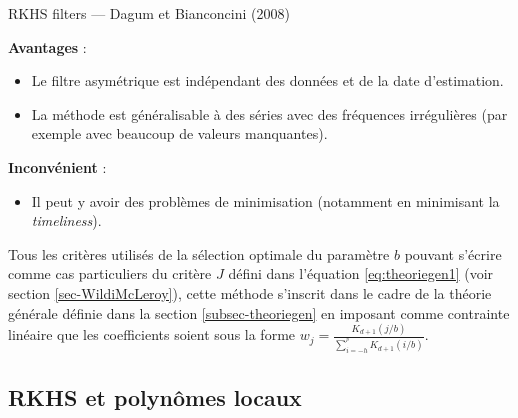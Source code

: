 \documentclass[
  11pt,
  french,
  a4paper]{article}
\providecommand{\tightlist}{%
  \setlength{\itemsep}{0pt}\setlength{\parskip}{0pt}}
\newcommand\1{\mathds{1}}
\begin{document}
\begin{summary_box}{RKHS filters --- Dagum et Bianconcini (2008)}

\textbf{Avantages} :

\begin{itemize}
\item
  Le filtre asymétrique est indépendant des données et de la date d'estimation.
\item
  La méthode est généralisable à des séries avec des fréquences irrégulières (par exemple avec beaucoup de valeurs manquantes).
\end{itemize}

\textbf{Inconvénient} :

\begin{itemize}
\tightlist
\item
  Il peut y avoir des problèmes de minimisation (notamment en minimisant la \emph{timeliness}).
\end{itemize}

\end{summary_box}

Tous les critères utilisés de la sélection optimale du paramètre \(b\) pouvant s'écrire comme cas particuliers du critère \(J\) défini dans l'équation \eqref{eq:theoriegen1} (voir section \ref{sec-WildiMcLeroy}), cette méthode s'inscrit dans le cadre de la théorie générale définie dans la section \ref{subsec-theoriegen} en imposant comme contrainte linéaire que les coefficients soient sous la forme \(w_j=\frac{K_{d+1}(j/b)}{\sum_{i=-h}^{^p}K_{d+1}(i/b)}\).

\hypertarget{rkhs-et-polynuxf4mes-locaux}{%
\subsection{RKHS et polynômes locaux}\label{rkhs-et-polynuxf4mes-locaux}}
\end{document}
